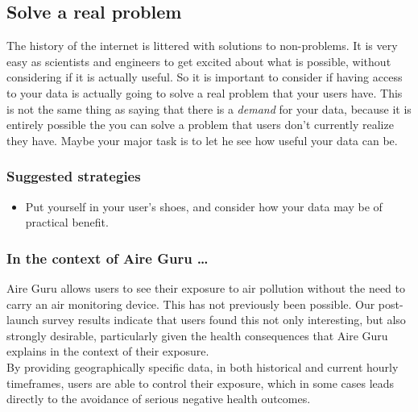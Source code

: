 \subsection{Solve a real problem}

The history of the internet is littered with solutions to non-problems.
It is very easy as scientists and engineers to get excited about what is possible, without considering if it is actually
useful. So it is important to consider if having access to your data is actually going to solve a real problem that your
users have. This is not the same thing as saying that there is a \emph{demand} for your data, because it is entirely possible 
the you can solve a problem that users don't currently realize they have.
Maybe your major task is to let he see how useful your data can be.\\

\subsubsection*{Suggested strategies} 

\begin{itemize}
    \item Put yourself in your user's shoes, and consider how your data may be of practical benefit.
\end{itemize}

\subsubsection*{In the context of Aire Guru \ldots} 

Aire Guru allows users to see their exposure to air pollution without the need to carry an air monitoring device.
This has not previously been possible. 
Our post-launch survey results indicate that users found this not only interesting, but also strongly desirable, 
particularly given the health consequences that Aire Guru explains in the context of their exposure.\\

By providing geographically specific data, in both historical and current hourly timeframes, users are able
to control their exposure, which in some cases leads directly to the avoidance of serious negative health outcomes.\\